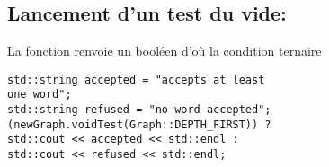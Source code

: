 \subsection{Lancement d'un test du vide:}
La fonction renvoie un booléen d'où la condition ternaire
\begin{verbatim} 
std::string accepted = "accepts at least 
one word";
std::string refused = "no word accepted";
(newGraph.voidTest(Graph::DEPTH_FIRST)) ? 
std::cout << accepted << std::endl :
std::cout << refused << std::endl;
\end{verbatim}
